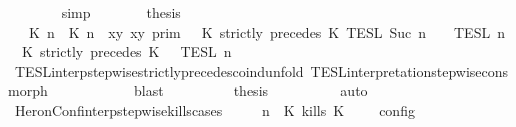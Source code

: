\begin{isabellebody}
\ \ \ \ \ \ \isamarkupfalse%
\ simp\isanewline
\ \ \ \ \isamarkupfalse%
\ \isamarkupfalse%
\ {\isacharquery}thesis\isanewline
\ \ \ \ \isamarkupfalse%
\ {\isacharminus}\isanewline
\ \ \ \ \ \ \isamarkupfalse%
\ {\isacartoucheopen}{\isasymlbrakk}\ {\isasymlceil}{\isacharhash}\isactrlsup {\isasymle}\ K\ n{\isacharcomma}\ {\isacharhash}\isactrlsup {\isacharless}\ K\ n{\isasymrceil}\ {\isasymin}\ {\isacharparenleft}{\isasymlambda}{\isacharparenleft}x{\isacharcomma}y{\isacharparenright}{\isachardot}\ x{\isasymle}y{\isacharparenright}\ {\isasymrbrakk}\isactrlsub p\isactrlsub r\isactrlsub i\isactrlsub m\ {\isasyminter}\ {\isasymlbrakk}\ K\ strictly\ precedes\ K\ {\isasymrbrakk}\isactrlsub T\isactrlsub E\isactrlsub S\isactrlsub L\isactrlbsup {\isasymge}\ Suc\ n\isactrlesup \ {\isasyminter}\ {\isasymlbrakk}{\isasymlbrakk}\ {\isasymPsi}\ {\isasymrbrakk}{\isasymrbrakk}\isactrlsub T\isactrlsub E\isactrlsub S\isactrlsub L\isactrlbsup {\isasymge}\ n\isactrlesup \ {\isacharequal}\ {\isasymlbrakk}{\isasymlbrakk}\ {\isacharparenleft}K\ strictly\ precedes\ K\ {\isacharhash}\ {\isasymPsi}\ {\isasymrbrakk}{\isasymrbrakk}\isactrlsub T\isactrlsub E\isactrlsub S\isactrlsub L\isactrlbsup {\isasymge}\ n\isactrlesup {\isacartoucheclose}\isanewline
\ \ \ \ \ \ \ \ \isamarkupfalse%
\ TESL{\isacharunderscore}interp{\isacharunderscore}stepwise{\isacharunderscore}strictly{\isacharunderscore}precedes{\isacharunderscore}coind{\isacharunderscore}unfold\ TESL{\isacharunderscore}interpretation{\isacharunderscore}stepwise{\isacharunderscore}cons{\isacharunderscore}morph\isanewline
\ \ \ \ \ \ \ \ \ \ \isamarkupfalse%
\ blast\isanewline
\ \ \ \ \ \ \isamarkupfalse%
\ \isamarkupfalse%
\ {\isacharquery}thesis\isanewline
\ \ \ \ \ \ \ \ \isamarkupfalse%
\ auto\isanewline
\ \ \ \ \isamarkupfalse%
\isanewline
\ \ \isamarkupfalse%
%
\endisatagproof
{\isafoldproof}%
%
\isadelimproof
\isanewline
%
\endisadelimproof
\isanewline
{}\isamarkupfalse%
\ HeronConf{\isacharunderscore}interp{\isacharunderscore}stepwise{\isacharunderscore}kills{\isacharunderscore}cases{\isacharcolon}\isanewline
\ \ \ {\isacartoucheopen}{\isasymlbrakk}\ {\isasymGamma}{\isacharcomma}\ n\ {\isasymturnstile}\ {\isacharparenleft}{\isacharparenleft}K\ kills\ K\ {\isacharhash}\ {\isasymPsi}{\isacharparenright}\ {\isasymtriangleright}\ {\isasymPhi}\ {\isasymrbrakk}\isactrlsub c\isactrlsub o\isactrlsub n\isactrlsub f\isactrlsub i\isactrlsub g\isanewline

\end{isabellebody}
